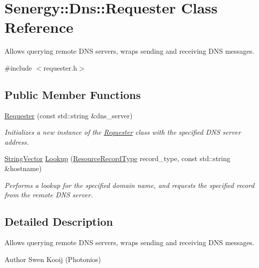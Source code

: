 \hypertarget{class_senergy_1_1_dns_1_1_requester}{\section{Senergy\-:\-:Dns\-:\-:Requester Class Reference}
\label{class_senergy_1_1_dns_1_1_requester}
}


Allows querying remote D\-N\-S servers, wraps sending and receiving D\-N\-S messages.  




{\ttfamily \#include $<$requester.\-h$>$}

\subsection*{Public Member Functions}
\begin{DoxyCompactItemize}
\item 
\hyperlink{class_senergy_1_1_dns_1_1_requester_a1b5fbbb5b5b115bdee9da48ce1466be0}{Requester} (const std\-::string \&dns\-\_\-server)
\begin{DoxyCompactList}\small\item\em Initializes a new instance of the \hyperlink{class_senergy_1_1_dns_1_1_requester}{Requester} class with the specified D\-N\-S server address. \end{DoxyCompactList}\item 
\hyperlink{namespace_senergy_a09aea2e19671645414361ca8388aebfe}{String\-Vector} \hyperlink{class_senergy_1_1_dns_1_1_requester_a9221196d35728ad295d542c6f5342475}{Lookup} (\hyperlink{namespace_senergy_1_1_dns_a590bfd748c955364770f5ce358d9dfe0}{Resource\-Record\-Type} record\-\_\-type, const std\-::string \&hostname)
\begin{DoxyCompactList}\small\item\em Performs a lookup for the specified domain name, and requests the specified record from the remote D\-N\-S server. \end{DoxyCompactList}\end{DoxyCompactItemize}


\subsection{Detailed Description}
Allows querying remote D\-N\-S servers, wraps sending and receiving D\-N\-S messages. 

\begin{DoxyAuthor}{Author}
Swen Kooij (Photonios) 
\end{DoxyAuthor}


